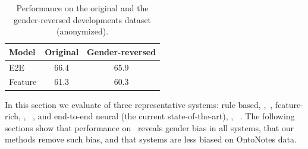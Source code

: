 

 \begin{table}[t]
 \small
 \centering
 \begin{tabular}{|l|c|c|}
         \hline 
          Model & Original & Gender-reversed \\
         \hline
         E2E & 66.4 &65.9 \\
         \hline
         Feature & 61.3 & 60.3\\
         \hline
     \end{tabular}
     \caption{ \small Performance on the original and the gender-reversed developments dataset (anonymized).}
     \label{tab:ontonotes_swapped}
 \end{table}





In this section we evaluate of three representative systems: 
rule based, \Stanford ,~\cite{raghunathan2010multi}, feature-rich, \Berkeley, ~\cite{DurrettKlein2013}, and end-to-end neural (the current state-of-the-art), \UW, ~\cite{lee2017end}.
The following sections show that performance on \dataset~reveals gender bias in all systems, that our methods remove such bias, and that systems are less biased on OntoNotes data. 

